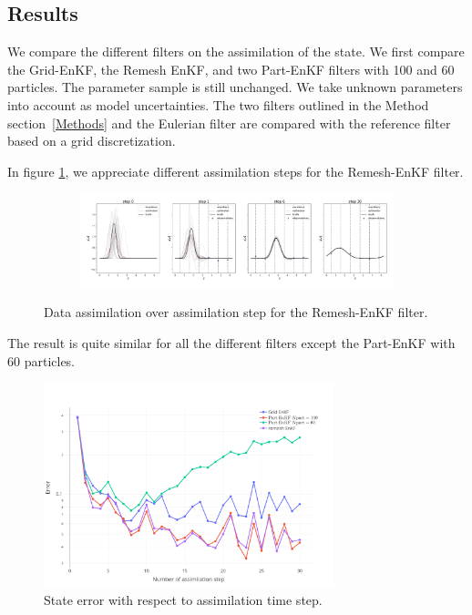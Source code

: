 \subsection{Results}

We compare the different filters on the assimilation of the state. We first compare the Grid-EnKF, the Remesh EnKF, and two Part-EnKF filters with 100 and 60 particles. The parameter sample is still unchanged. We take unknown parameters into account as model uncertainties. The two filters outlined in the Method section~\ref{Methods} and the Eulerian filter are compared with the reference filter based on a grid discretization.

In figure \ref{fig:1d_error_time}, we appreciate different assimilation steps for the Remesh-EnKF filter.


\begin{figure}
	\centering
	\begin{subfigure}{\textwidth}
		\includegraphics[width=\textwidth]{images/app1d/wo_calibration/remesh_EnKF.pdf}
	\end{subfigure}
	\caption{Data assimilation over assimilation step for the Remesh-EnKF filter.}
\end{figure}

The result is quite similar for all the different filters except the Part-EnKF with 60 particles.

\begin{figure}
	\centering
	\includegraphics[width=0.75\textwidth]{images/app1d/wo_calibration/state_error.png}
	\caption{State error with respect to assimilation time step.}
	\label{fig:1d_error_time}
\end{figure}

